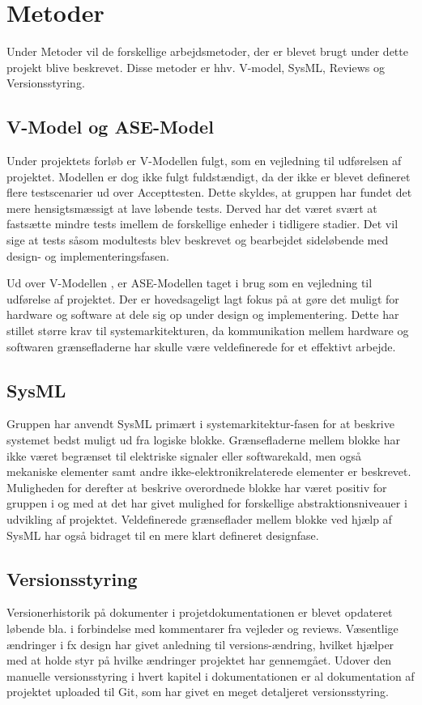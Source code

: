 \section{Metoder} \label{ch:Metoder}

Under Metoder vil de forskellige arbejdsmetoder, der er blevet brugt under dette projekt blive beskrevet. Disse metoder er hhv. V-model, SysML, Reviews og Versionsstyring.

\subsection{V-Model og ASE-Model} 
Under projektets forløb er V-Modellen fulgt, som en vejledning til udførelsen af projektet. Modellen er dog ikke fulgt fuldstændigt, da der ikke er blevet defineret flere testscenarier ud over Accepttesten. Dette skyldes, at gruppen har fundet det mere hensigtsmæssigt at lave løbende tests. Derved har det været svært at fastsætte mindre tests imellem de forskellige enheder i tidligere stadier. Det vil sige at tests såsom modultests blev beskrevet og bearbejdet sideløbende med design- og implementeringsfasen.

Ud over V-Modellen \cite{lib:T-006}, er ASE-Modellen \cite{lib:vejledning} taget i brug som en vejledning til udførelse af projektet. Der er hovedsageligt lagt fokus på at gøre det muligt for hardware og software at dele sig op under design og implementering. Dette har stillet større krav til systemarkitekturen, da kommunikation mellem hardware og softwaren grænsefladerne har skulle være veldefinerede for et effektivt arbejde.

\subsection{SysML}
Gruppen har anvendt SysML primært i systemarkitektur-fasen for at beskrive systemet bedst muligt ud fra logiske blokke.
Grænsefladerne mellem blokke har ikke været begrænset til elektriske signaler eller softwarekald, men også mekaniske elementer samt andre ikke-elektronikrelaterede elementer er beskrevet. 
Muligheden for derefter at beskrive overordnede blokke har været positiv for gruppen i og med at det har givet mulighed for forskellige abstraktionsniveauer i udvikling af projektet.
Veldefinerede grænseflader mellem blokke ved hjælp af SysML har også bidraget til en mere klart defineret designfase.

\clearpage

\subsection{Versionsstyring}
Versionerhistorik på dokumenter i projetdokumentationen er blevet opdateret løbende bla. i forbindelse med kommentarer fra vejleder og reviews. Væsentlige ændringer i fx design har givet anledning til versions-ændring, hvilket hjælper med at holde styr på hvilke ændringer projektet har gennemgået.
Udover den manuelle versionsstyring i hvert kapitel i dokumentationen er al dokumentation af projektet uploaded til Git, som har givet en meget detaljeret versionsstyring.

